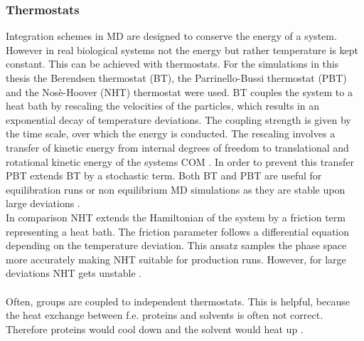 \subsubsection{Thermostats}
Integration schemes in MD are designed to conserve the energy of a system. However in real biological systems not the energy but rather temperature is kept constant. This can be achieved with thermostats. For the simulations in this thesis the Berendsen thermostat \autocite{berendsen} (BT), the Parrinello-Bussi thermostat \autocite{parinelloBussi} (PBT) and the Nosè-Hoover (NHT) thermostat \autocites{nosehooverthermo}{nosehooverthermo2} were used. BT couples the system to a heat bath by rescaling the velocities of the particles, which results in an exponential decay of temperature deviations. The coupling strength is given by the time scale, over which the energy is conducted. The rescaling involves a transfer of kinetic energy from internal degrees of freedom to translational and rotational kinetic energy of the systems COM \autocite{velRescaleSucks}. In order to prevent this transfer PBT extends BT by a stochastic term. Both BT and PBT are useful for equilibration runs or non equilibrium MD simulations as they are stable upon large deviations \autocites{berendsen}[p. 31]{gromacsManual}.\\%
In comparison NHT extends the Hamiltonian of the system by a friction term representing a heat bath. The friction parameter follows a differential equation depending on the temperature deviation. This ansatz samples the phase space more accurately making NHT suitable for production runs. However, for large deviations NHT gets unstable \autocite[p. 32f]{gromacsManual}.\\
\\
Often, groups are coupled to independent thermostats. This is helpful, because the heat exchange between f.e. proteins and solvents is often not correct. Therefore proteins would cool down and the solvent would heat up \autocite[p. 34]{gromacsManual}.
